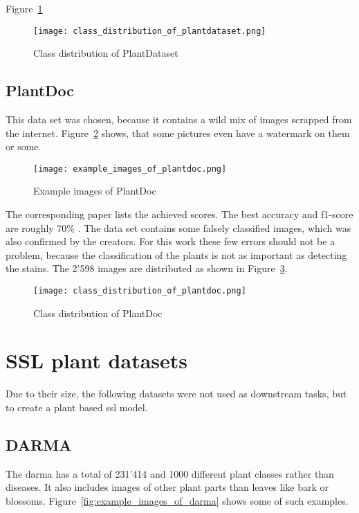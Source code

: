 Figure~\ref{fig:class_distribution_of_plantdataset}
\begin{figure}[H]
    \begin{center}
    \texttt{[image: class\_distribution\_of\_plantdataset.png]}
    \caption{Class distribution of PlantDataset}\label{fig:class_distribution_of_plantdataset}
    \end{center}
\end{figure}

\subsection{PlantDoc}
This data set was chosen, because it contains a wild mix of images scrapped from the internet. 
Figure~\ref{fig:example_images_of_plantdoc} shows, that some pictures even have a watermark on them or some.
\begin{figure}[H]
    \begin{center}
    \texttt{[image: example\_images\_of\_plantdoc.png]}
    \caption{Example images of PlantDoc}\label{fig:example_images_of_plantdoc}
    \end{center}
\end{figure}
The corresponding paper lists the achieved scores. 
The best accuracy and f1-score are roughly 70\% \autocite{singh2020}. 
The data set contains some falsely classified images, which was also confirmed by the creators. 
For this work these few errors should not be a problem, because the classification of the plants is not as important as detecting the stains.
The 2'598 images are distributed as shown in Figure~\ref{fig:class_distribution_of_plantdoc}.

\begin{figure}[H]
    \begin{center}
    \texttt{[image: class\_distribution\_of\_plantdoc.png]}
    \caption{Class distribution of PlantDoc}\label{fig:class_distribution_of_plantdoc}
    \end{center}
\end{figure}

\section{SSL plant datasets}
Due to their size, the following datasets were not used as downstream tasks, but to create a plant based \gls{ssl} model. 
\subsection{DARMA}
The \gls{darma} has a total of 231'414 and 1000 different plant classes rather than diseases. 
It also includes images of other plant parts than leaves like bark or blossoms. 
Figure~\ref{fig:example_images_of_darma} shows some of such examples.

